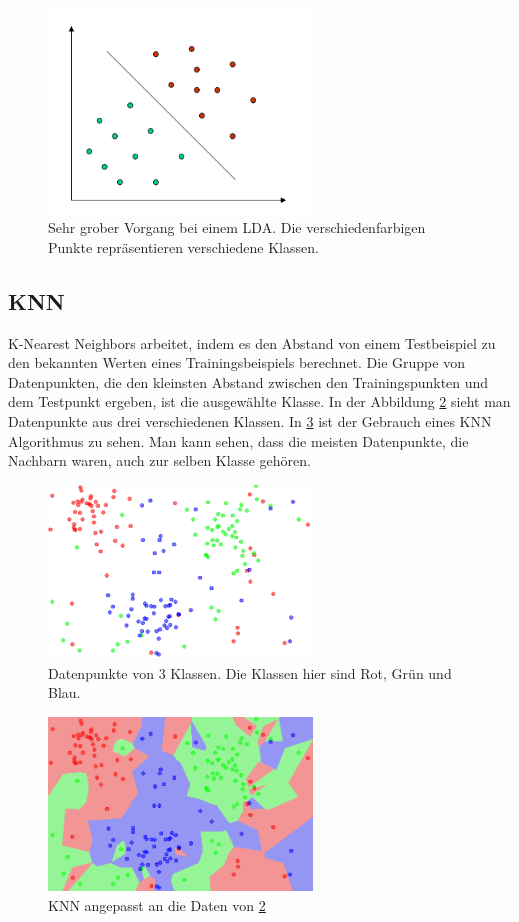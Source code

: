 \begin{figure}[H]
  \centering
  \includegraphics[width=70mm,scale=0.7]{LDA.png}
  \caption{Sehr grober Vorgang bei einem LDA. Die verschiedenfarbigen Punkte repräsentieren verschiedene Klassen. \cite{Wikimedia-Common3}}
  \label{fig:lda1}
\end{figure}

\subsection{KNN}
K-Nearest Neighbors arbeitet, indem es den Abstand von einem Testbeispiel zu den bekannten Werten eines Trainingsbeispiels berechnet. Die Gruppe von Datenpunkten, die den kleinsten Abstand zwischen den Trainingspunkten und dem Testpunkt ergeben, ist die ausgewählte Klasse. In der Abbildung  \ref{fig:knn1} sieht man Datenpunkte aus drei verschiedenen Klassen. In  \ref{fig:knn2} ist der Gebrauch eines KNN Algorithmus zu sehen. Man kann sehen, dass die meisten Datenpunkte, die Nachbarn waren, auch zur selben Klasse gehören. 

\begin{figure}[H]
  \centering
  \includegraphics[width=70mm,scale=0.7]{KNN2.png}
  \caption{Datenpunkte von 3 Klassen. Die Klassen hier sind Rot, Grün und Blau.\cite{Wikimedia-Common2} }
  \label{fig:knn1}
\end{figure}

\begin{figure}[H]
  \centering
  \includegraphics[width=70mm,scale=0.7]{KNN1.png}
  \caption{KNN angepasst an die Daten von \ref{fig:knn1}\cite{Wikimedia-Common} }
  \label{fig:knn2}
\end{figure}


